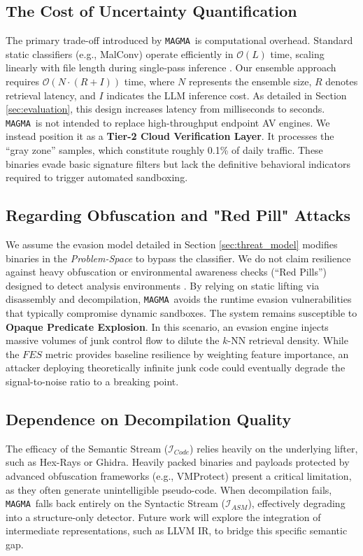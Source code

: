 \documentclass[pdflatex,sn-mathphys-num]{sn-jnl}
\newcommand{\sysname}{\texttt{MAGMA}~}
\begin{document}
\subsection{The Cost of Uncertainty Quantification}
The primary trade-off introduced by \sysname is computational overhead. Standard static classifiers (e.g., MalConv) operate efficiently in $\mathcal{O}(L)$ time, scaling linearly with file length during single-pass inference \cite{RaffEdward2018Malware}. Our ensemble approach requires $\mathcal{O}(N \cdot (R + I))$ time, where $N$ represents the ensemble size, $R$ denotes retrieval latency, and $I$ indicates the LLM inference cost. As detailed in Section \ref{sec:evaluation}, this design increases latency from milliseconds to seconds. \sysname is not intended to replace high-throughput endpoint AV engines. We instead position it as a \textbf{Tier-2 Cloud Verification Layer}. It processes the ``gray zone'' samples, which constitute roughly 0.1\% of daily traffic. These binaries evade basic signature filters but lack the definitive behavioral indicators required to trigger automated sandboxing.

\subsection{Regarding Obfuscation and "Red Pill" Attacks}
We assume the evasion model detailed in Section \ref{sec:threat_model} modifies binaries in the \textit{Problem-Space} to bypass the classifier. We do not claim resilience against heavy obfuscation or environmental awareness checks (``Red Pills'') designed to detect analysis environments \cite{Bulazel_Alexei2017Survey}. By relying on static lifting via disassembly and decompilation, \sysname avoids the runtime evasion vulnerabilities that typically compromise dynamic sandboxes. The system remains susceptible to \textbf{Opaque Predicate Explosion}. In this scenario, an evasion engine injects massive volumes of junk control flow to dilute the $k$-NN retrieval density. While the $FES$ metric provides baseline resilience by weighting feature importance, an attacker deploying theoretically infinite junk code could eventually degrade the signal-to-noise ratio to a breaking point.

\subsection{Dependence on Decompilation Quality}
The efficacy of the Semantic Stream ($\mathcal{I}_{Code}$) relies heavily on the underlying lifter, such as Hex-Rays or Ghidra. Heavily packed binaries and payloads protected by advanced obfuscation frameworks (e.g., VMProtect) present a critical limitation, as they often generate unintelligible pseudo-code. When decompilation fails, \sysname falls back entirely on the Syntactic Stream ($\mathcal{I}_{ASM}$), effectively degrading into a structure-only detector. Future work will explore the integration of intermediate representations, such as LLVM IR, to bridge this specific semantic gap.
\end{document}
